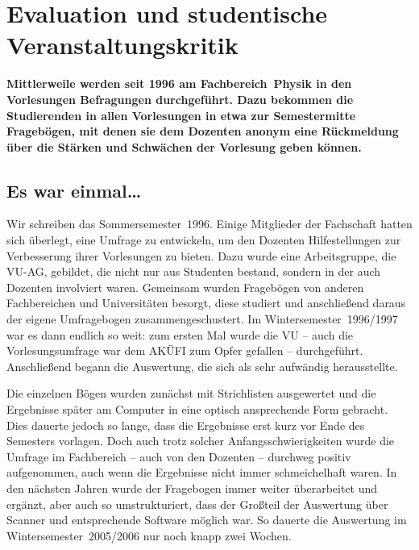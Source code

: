 \section{Evaluation und studentische Veranstaltungskritik}
\vspace{-3ex}
\begin{multicols}{2}
\fibelspacingsubsubsection[subsection]

\textbf{Mittlerweile werden seit 1996 am Fachbereich~Physik in den Vorlesungen Befragungen durchgeführt.
Dazu bekommen die Studierenden in allen Vorlesungen in etwa zur Semestermitte Fragebögen, mit denen sie dem Dozenten anonym eine Rückmeldung über die Stärken und Schwächen der Vorlesung geben können.}

\subsection{Es war einmal\dots}
Wir schreiben das Sommersemester~1996.
Einige Mitglieder der Fachschaft hatten sich überlegt, eine Umfrage zu entwickeln, um den Dozenten Hilfestellungen zur Verbesserung ihrer Vorlesungen zu bieten.
Dazu wurde eine Arbeitsgruppe, die VU-AG, gebildet, die nicht nur aus Studenten bestand, sondern in der auch Dozenten involviert waren.
Gemeinsam wurden Fragebögen von anderen Fachbereichen und Universitäten besorgt, diese studiert und anschließend daraus der eigene Umfragebogen zusammengeschustert.
Im Wintersemester~1996/1997 war es dann endlich so weit: zum ersten Mal wurde die VU -- auch die Vorlesungsumfrage war dem AKÜFI zum Opfer gefallen -- durchgeführt.
Anschließend begann die Auswertung, die sich als sehr aufwändig herausstellte.

Die einzelnen Bögen wurden zunächst mit Strichlisten ausgewertet und die Ergebnisse später am Computer in eine optisch ansprechende Form gebracht.
Dies dauerte jedoch so lange, dass die Ergebnisse erst kurz vor Ende des Semesters vorlagen.
Doch auch trotz solcher Anfangsschwierigkeiten wurde die Umfrage im Fachbereich -- auch von den Dozenten -- durchweg positiv aufgenommen, auch wenn die Ergebnisse nicht immer schmeichelhaft waren.
In den nächsten Jahren wurde der Fragebogen immer weiter überarbeitet und ergänzt, aber auch so umstrukturiert, dass der Großteil der Auswertung über Scanner und entsprechende Software möglich war.
So dauerte die Auswertung im Wintersemester~2005/2006 nur noch knapp zwei Wochen.


\end{multicols}
